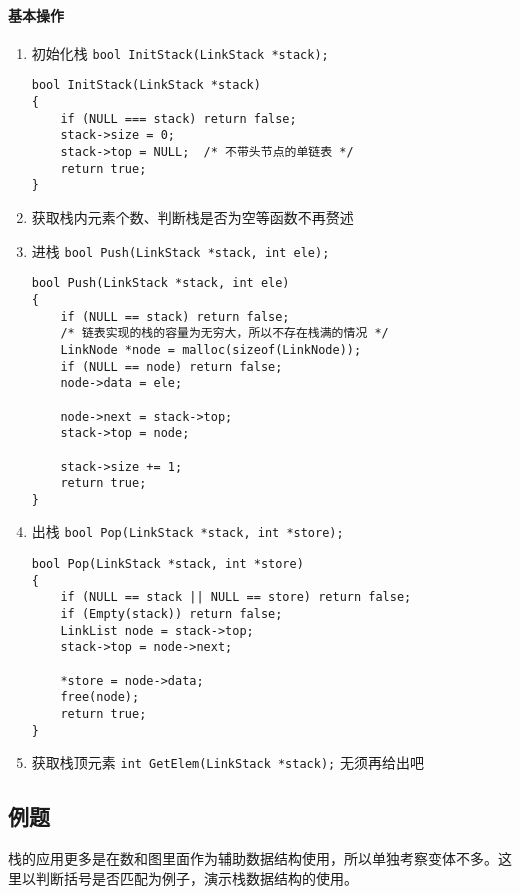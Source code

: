 \documentclass{ctexart}
\begin{document}
\paragraph{基本操作}
\begin{enumerate}
\item 初始化栈 \texttt{bool InitStack(LinkStack *stack);}
\begin{verbatim}
bool InitStack(LinkStack *stack)
{
    if (NULL === stack) return false;
    stack->size = 0;
    stack->top = NULL;  /* 不带头节点的单链表 */
    return true;
}
\end{verbatim}

\item 获取栈内元素个数、判断栈是否为空等函数不再赘述

\item 进栈 \texttt{bool Push(LinkStack *stack, int ele);}
\begin{verbatim}
bool Push(LinkStack *stack, int ele)
{
    if (NULL == stack) return false;
    /* 链表实现的栈的容量为无穷大，所以不存在栈满的情况 */
    LinkNode *node = malloc(sizeof(LinkNode));
    if (NULL == node) return false;
    node->data = ele;

    node->next = stack->top;
    stack->top = node;

    stack->size += 1;
    return true;
}
\end{verbatim}

\item 出栈 \texttt{bool Pop(LinkStack *stack, int *store);}
\begin{verbatim}
bool Pop(LinkStack *stack, int *store)
{
    if (NULL == stack || NULL == store) return false;
    if (Empty(stack)) return false;
    LinkList node = stack->top;
    stack->top = node->next;

    *store = node->data;
    free(node);
    return true;
}
\end{verbatim}

\item 获取栈顶元素 \texttt{int GetElem(LinkStack *stack);} 无须再给出吧
\end{enumerate}

\subsection{例题}
栈的应用更多是在数和图里面作为辅助数据结构使用，所以单独考察变体不多。这里以判断括号是否匹配为例子，演示栈数据结构的使用。
\inputminted{c}{codes/is-brackets-valid.c}
\end{document}
